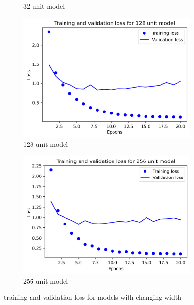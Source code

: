 \documentclass{article}
\begin{document}
\begin{figure}[H]
\begin{subfigure}{.5\textwidth}
            \caption{32 unit model}
            \label{fig4:sfig2}
        \end{subfigure}
        \begin{subfigure}{.5\textwidth}
            \centering
            \includegraphics[width=\linewidth]{images/reuters/2.png}
            \caption{128 unit model}
            \label{fig4:sfig3}
        \end{subfigure}
        \begin{subfigure}{.5\textwidth}
            \centering
            \includegraphics[width=\linewidth]{images/reuters/3.png}
            \caption{256 unit model}
            \label{fig4:sfig4}
        \end{subfigure}
        \caption{training and validation loss for models with changing width}
        \label{fig4:fig}
    \end{figure}
\end{document}
